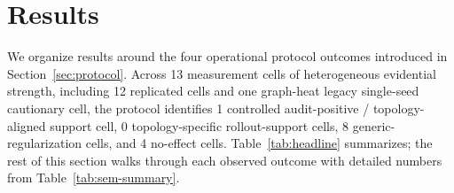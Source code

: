 \documentclass[preprint,12pt]{elsarticle}
\begin{document}
\section{Results}
\label{sec:results}

We organize results around the four operational protocol outcomes 
introduced in Section~\ref{sec:protocol}. Across 13 measurement cells 
of heterogeneous evidential strength, including 12 replicated cells 
and one graph-heat legacy single-seed cautionary cell, the protocol 
identifies 1 controlled audit-positive / topology-aligned support 
cell, 0 topology-specific rollout-support cells, 8 
generic-regularization cells, and 4 no-effect cells. 
Table~\ref{tab:headline} summarizes; the rest of this section walks 
through each observed outcome with detailed numbers from 
Table~\ref{tab:sem-summary}.
\end{document}
